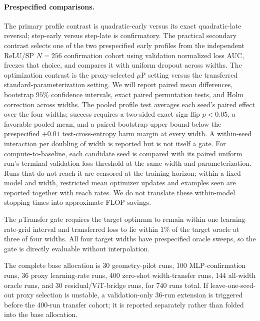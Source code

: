 \paragraph{Prespecified comparisons.}
The primary profile contrast is quadratic-early versus its exact quadratic-late reversal; step-early versus step-late is confirmatory. The practical secondary contrast selects one of the two prespecified early profiles from the independent ReLU/SP \(N=256\) confirmation cohort using validation normalized loss AUC, freezes that choice, and compares it with uniform dropout across widths. The optimization contrast is the proxy-selected \(\mu\)P setting versus the transferred standard-parameterization setting. We will report paired mean differences, bootstrap \(95\%\) confidence intervals, exact paired permutation tests, and Holm correction across widths. The pooled profile test averages each seed's paired effect over the four widths; success requires a two-sided exact sign-flip \(p<0.05\), a favorable pooled mean, and a paired-bootstrap upper bound below the prespecified \(+0.01\) test-cross-entropy harm margin at every width. A within-seed interaction per doubling of width is reported but is not itself a gate. For compute-to-baseline, each candidate seed is compared with its paired uniform run's terminal validation-loss threshold at the same width and parameterization. Runs that do not reach it are censored at the training horizon; within a fixed model and width, restricted mean optimizer updates and examples seen are reported together with reach rates. We do not translate these within-model stopping times into approximate FLOP savings.

The \(\mu\)Transfer gate requires the target optimum to remain within one learning-rate-grid interval and transferred loss to lie within \(1\%\) of the target oracle at three of four widths. All four target widths have prespecified oracle sweeps, so the gate is directly evaluable without interpolation.

The complete base allocation is 30 geometry-pilot runs, 100 MLP-confirmation runs, 36 proxy learning-rate runs, 400 zero-shot width-transfer runs, 144 all-width oracle runs, and 30 residual/ViT-bridge runs, for 740 runs total. If leave-one-seed-out proxy selection is unstable, a validation-only 36-run extension is triggered before the 400-run transfer cohort; it is reported separately rather than folded into the base allocation.
